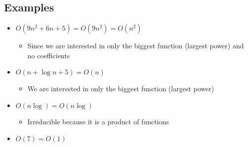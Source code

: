\documentclass[hidelinks,11pt]{article}
\begin{document}
\subsection{Examples}
\begin{itemize}
    \item $O(9n^2+6n+5) = O(9n^2) = O(n^2)$ 
    \begin{itemize}
        \item Since we are interested in only the biggest function (largest power) and no coefficients
    \end{itemize} 
    \item $O(n+\log n +5) = O(n)$ 
    \begin{itemize}
        \item We are interested in only the biggest function (largest power)
    \end{itemize} 
    \item $O(n\log) = O(n\log)$ \begin{itemize}
        \item Irreducible because it is a product of functions
    \end{itemize} 
    \item $O(7) = O(1)$
\end{itemize}
\end{document}
